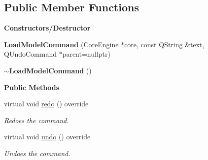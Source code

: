\subsection*{Public Member Functions}
\begin{Indent}\textbf{ Constructors/\+Destructor}\par
\begin{DoxyCompactItemize}
\item 
\mbox{\label{classrev_1_1_load_model_command_aa23289854e5372e84edfbfb1e65c13f5}} 
{\bfseries Load\+Model\+Command} (\mbox{\hyperlink{classrev_1_1_core_engine}{Core\+Engine}} $\ast$core, const Q\+String \&text, Q\+Undo\+Command $\ast$parent=nullptr)
\item 
\mbox{\label{classrev_1_1_load_model_command_a97d4777b3a5fef097fcabef4127b373a}} 
{\bfseries $\sim$\+Load\+Model\+Command} ()
\end{DoxyCompactItemize}
\end{Indent}
\begin{Indent}\textbf{ Public Methods}\par
\begin{DoxyCompactItemize}
\item 
\mbox{\label{classrev_1_1_load_model_command_a4a1c4a630181623f0fb29eee8db64eb6}} 
virtual void \mbox{\hyperlink{classrev_1_1_load_model_command_a4a1c4a630181623f0fb29eee8db64eb6}{redo}} () override
\begin{DoxyCompactList}\small\item\em Redoes the command. \end{DoxyCompactList}\item 
\mbox{\label{classrev_1_1_load_model_command_a9004f0c2e1a9ae6cc2fb840b645ffe02}} 
virtual void \mbox{\hyperlink{classrev_1_1_load_model_command_a9004f0c2e1a9ae6cc2fb840b645ffe02}{undo}} () override
\begin{DoxyCompactList}\small\item\em Undoes the command. \end{DoxyCompactList}\end{DoxyCompactItemize}
\end{Indent}
